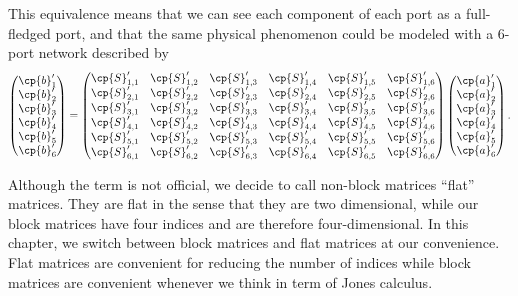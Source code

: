 \begin{refsection}
\begin{equation}
\end{equation}
This equivalence means that we can see each component of each port as a full-fledged port, and that the same physical phenomenon could be modeled with a 6-port network described by
\begin{equation}
    \begin{pmatrix}
        \cp{b}'_1 \\ \cp{b}'_2 \\ \cp{b}'_3 \\ \cp{b}'_{4} \\ \cp{b}'_{5} \\ \cp{b}'_{6}
    \end{pmatrix}
    =
    \begin{pmatrix}
        \cp{S}'_{1, 1} & \cp{S}'_{1, 2} & \cp{S}'_{1, 3} & \cp{S}'_{1, 4} & \cp{S}'_{1, 5} & \cp{S}'_{1, 6} \\
        \cp{S}'_{2, 1} & \cp{S}'_{2, 2} & \cp{S}'_{2, 3} & \cp{S}'_{2, 4} & \cp{S}'_{2, 5} & \cp{S}'_{2, 6} \\
        \cp{S}'_{3, 1} & \cp{S}'_{3, 2} & \cp{S}'_{3, 3} & \cp{S}'_{3, 4} & \cp{S}'_{3, 5} & \cp{S}'_{3, 6} \\
        \cp{S}'_{4, 1} & \cp{S}'_{4, 2} & \cp{S}'_{4, 3} & \cp{S}'_{4, 4} & \cp{S}'_{4, 5} & \cp{S}'_{4, 6} \\
        \cp{S}'_{5, 1} & \cp{S}'_{5, 2} & \cp{S}'_{5, 3} & \cp{S}'_{5, 4} & \cp{S}'_{5, 5} & \cp{S}'_{5, 6} \\
        \cp{S}'_{6, 1} & \cp{S}'_{6, 2} & \cp{S}'_{6, 3} & \cp{S}'_{6, 4} & \cp{S}'_{6, 5} & \cp{S}'_{6, 6}
    \end{pmatrix}
    \begin{pmatrix}
        \cp{a}'_1 \\ \cp{a}'_2 \\ \cp{a}'_3 \\ \cp{a}'_{4} \\ \cp{a}'_{5} \\ \cp{a}'_{6}
    \end{pmatrix}
    \text{.}
    \label{eq:matrix_totally_flattenned}
\end{equation}

Although the term is not official, we decide to call non-block matrices ``flat'' matrices.
They are flat in the sense that they are two dimensional, while our block matrices have four indices and are therefore four-dimensional.
In this chapter, we switch between block matrices and flat matrices at our convenience.
Flat matrices are convenient for reducing the number of indices while block matrices are convenient whenever we think in term of Jones calculus.



\end{refsection}
